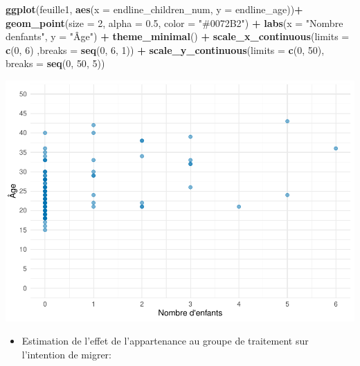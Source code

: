 \documentclass[
]{article}
\newenvironment{Shaded}{\begin{snugshade}}{\end{snugshade}}
\newcommand{\AttributeTok}[1]{\textcolor[rgb]{0.13,0.29,0.53}{#1}}
\newcommand{\DecValTok}[1]{\textcolor[rgb]{0.00,0.00,0.81}{#1}}
\newcommand{\FloatTok}[1]{\textcolor[rgb]{0.00,0.00,0.81}{#1}}
\newcommand{\FunctionTok}[1]{\textcolor[rgb]{0.13,0.29,0.53}{\textbf{#1}}}
\newcommand{\NormalTok}[1]{#1}
\newcommand{\SpecialCharTok}[1]{\textcolor[rgb]{0.81,0.36,0.00}{\textbf{#1}}}
\newcommand{\StringTok}[1]{\textcolor[rgb]{0.31,0.60,0.02}{#1}}
\providecommand{\tightlist}{%
  \setlength{\itemsep}{0pt}\setlength{\parskip}{0pt}}
\begin{document}
\begin{Shaded}
\begin{Highlighting}[]
\FunctionTok{ggplot}\NormalTok{(feuille1, }\FunctionTok{aes}\NormalTok{(}\AttributeTok{x =}\NormalTok{ endline\_children\_num, }\AttributeTok{y =}\NormalTok{ endline\_age))}\SpecialCharTok{+}
  \FunctionTok{geom\_point}\NormalTok{(}\AttributeTok{size =} \DecValTok{2}\NormalTok{, }\AttributeTok{alpha =} \FloatTok{0.5}\NormalTok{, }\AttributeTok{color =} \StringTok{"\#0072B2"}\NormalTok{) }\SpecialCharTok{+}
  \FunctionTok{labs}\NormalTok{(}\AttributeTok{x =} \StringTok{"Nombre d\textquotesingle{}enfants"}\NormalTok{, }\AttributeTok{y =} \StringTok{"Âge"}\NormalTok{) }\SpecialCharTok{+}
  \FunctionTok{theme\_minimal}\NormalTok{() }\SpecialCharTok{+}
  \FunctionTok{scale\_x\_continuous}\NormalTok{(}\AttributeTok{limits =} \FunctionTok{c}\NormalTok{(}\DecValTok{0}\NormalTok{, }\DecValTok{6}\NormalTok{) ,}\AttributeTok{breaks =} \FunctionTok{seq}\NormalTok{(}\DecValTok{0}\NormalTok{, }\DecValTok{6}\NormalTok{, }\DecValTok{1}\NormalTok{)) }\SpecialCharTok{+}
  \FunctionTok{scale\_y\_continuous}\NormalTok{(}\AttributeTok{limits =} \FunctionTok{c}\NormalTok{(}\DecValTok{0}\NormalTok{, }\DecValTok{50}\NormalTok{), }\AttributeTok{breaks =} \FunctionTok{seq}\NormalTok{(}\DecValTok{0}\NormalTok{, }\DecValTok{50}\NormalTok{, }\DecValTok{5}\NormalTok{))}
\end{Highlighting}
\end{Shaded}

\includegraphics{RMarkdown_files/figure-latex/unnamed-chunk-30-1.pdf}

\begin{itemize}
\tightlist
\item
  Estimation de l'effet de l'appartenance au groupe de traitement sur
  l'intention de migrer:
\end{itemize}
\end{document}
